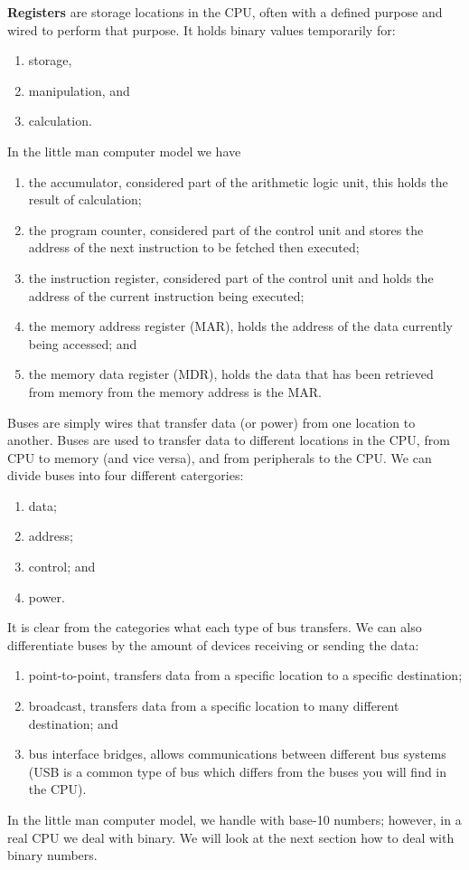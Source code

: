 \begin{definition}
    \textbf{Registers} are storage locations in the CPU, often with a defined purpose and wired to perform that purpose. It holds binary values temporarily for:
    \begin{enumerate}[label=(\roman*)]
        \item storage,
        \item manipulation, and
        \item calculation.
    \end{enumerate}
    In the little man computer model we have
    \begin{enumerate}
        \item the accumulator, considered part of the arithmetic logic unit, this holds the result of calculation;
        \item the program counter, considered part of the control unit and stores the address of the next instruction to be fetched then executed;
        \item the instruction register, considered part of the control unit and holds the address of the current instruction being executed;
        \item the memory address register (MAR), holds the address of the data currently being accessed; and
        \item the memory data register (MDR), holds the data that has been retrieved from memory from the memory address is the MAR.
    \end{enumerate}
\end{definition}

\begin{definition}[Buses]
    Buses are simply wires that transfer data (or power) from one location to another. Buses are used to transfer data to different locations in the CPU, from CPU to memory (and vice versa), and from peripherals to the CPU. We can divide buses into four different catergories:
    \begin{enumerate}
        \item data;
        \item address;
        \item control; and
        \item power.
    \end{enumerate}
    It is clear from the categories what each type of bus transfers. We can also differentiate buses by the amount of devices receiving or sending the data:
    \begin{enumerate}
        \item point-to-point, transfers data from a specific location to a specific destination;
        \item broadcast, transfers data from a specific location to many different destination; and
        \item bus interface bridges, allows communications between different bus systems (USB is a common type of bus which differs from the buses you will find in the CPU).
    \end{enumerate}
\end{definition}

\begin{remark}
    In the little man computer model, we handle with base-10 numbers; however, in a real CPU we deal with binary. We will look at the next section how to deal with binary numbers.
\end{remark}
